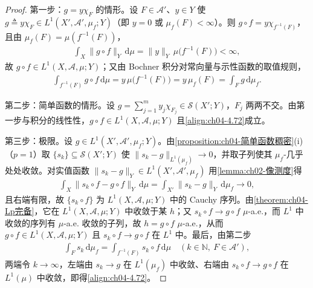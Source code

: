 \documentclass[../../main.tex]{subfiles}%
\begin{document}
\begin{proof}
第一步：$g=y\chi_F$ 的情形。设 $F\in\mathcal{A}'$、$y\in Y$ 使 $g\triangleq y\chi_F\in L^1(X',\mathcal{A}',\mu_f;Y)$（即 $y=0$ 或 $\mu_f(F)<\infty$）。则 $g\circ f=y\chi_{f^{-1}(F)}$，且由 $\mu_f(F)=\mu(f^{-1}(F))$，
\begin{align*}
\int_X\|g\circ f\|_Y\,\mathrm{d}\mu=\|y\|_Y\,\mu\big(f^{-1}(F)\big)<\infty,
\end{align*}
故 $g\circ f\in L^1(X,\mathcal{A},\mu;Y)$；又由 Bochner 积分对常向量与示性函数的取值规则，
\begin{align*}
\int_{f^{-1}(F)}g\circ f\,\mathrm{d}\mu=y\,\mu\big(f^{-1}(F)\big)=y\,\mu_f(F)=\int_Fg\,\mathrm{d}\mu_f .
\end{align*}

第二步：简单函数的情形。设 $g=\sum_{j=1}^m y_j\chi_{F_j}\in\mathcal{S}(X';Y)$，$F_j$ 两两不交。由第一步与积分的线性性，$g\circ f\in L^1(X,\mathcal{A},\mu;Y)$ 且\eqref{align:ch04-4.72}成立。

第三步：极限。设 $g\in L^1(X',\mathcal{A}',\mu_f;Y)$。由\cref{proposition:ch04-简单函数稠密}(i)（$p=1$）取 $\{s_k\}\subseteq\mathcal{S}(X';Y)$ 使 $\|s_k-g\|_{L^1(\mu_f)}\to0$，并取子列使其 $\mu_f$-几乎处处收敛。对实值函数 $\|s_k-g\|_Y\in L^1(X',\mathcal{A}',\mu_f)$ 用\cref{lemma:ch02-像测度}得
\begin{align*}
\int_X\|s_k\circ f-g\circ f\|_Y\,\mathrm{d}\mu=\int_{X'}\|s_k-g\|_Y\,\mathrm{d}\mu_f\longrightarrow0,
\end{align*}
且右端有限，故 $\{s_k\circ f\}$ 为 $L^1(X,\mathcal{A},\mu;Y)$ 中的 Cauchy 序列。由\cref{theorem:ch04-Lp完备}，它在 $L^1(X,\mathcal{A},\mu;Y)$ 中收敛于某 $h$；又 $s_k\circ f\to g\circ f$ $\mu$-a.e.，而 $L^1$ 中收敛的序列有 $\mu$-a.e. 收敛的子列，故 $h=g\circ f$ $\mu$-a.e.，从而 $g\circ f\in L^1(X,\mathcal{A},\mu;Y)$ 且 $s_k\circ f\to g\circ f$ 在 $L^1$ 中。最后，由第二步
\begin{align*}
\int_Fs_k\,\mathrm{d}\mu_f=\int_{f^{-1}(F)}s_k\circ f\,\mathrm{d}\mu\quad(k\in\mathbb{N},\ F\in\mathcal{A}'),
\end{align*}
两端令 $k\to\infty$，左端由 $s_k\to g$ 在 $L^1(\mu_f)$ 中收敛、右端由 $s_k\circ f\to g\circ f$ 在 $L^1(\mu)$ 中收敛，即得\eqref{align:ch04-4.72}。
\end{proof}
\end{document}
